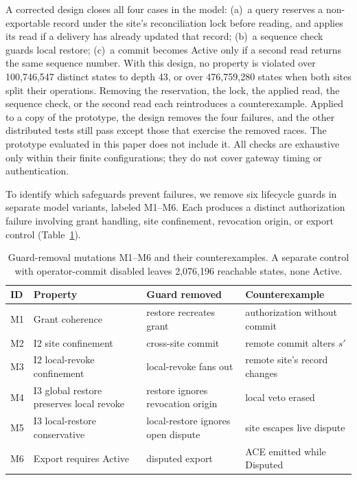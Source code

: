 \documentclass[journal]{IEEEtran}
\theoremstyle{definition}
\begin{document}
A corrected design closes all four cases in the model:
(a)~a query reserves a non-exportable record under the site's reconciliation lock before reading, and applies its read if a delivery has already updated that record;
(b)~a sequence check guards local restore;
(c)~a commit becomes Active only if a second read returns the same sequence number.
With this design, no property is violated over 100,746,547 distinct states to depth 43, or over 476,759,280 states when both sites split their operations. Removing the reservation, the lock, the applied read, the sequence check, or the second read each reintroduces a counterexample. Applied to a copy of the prototype, the design removes the four failures, and the other distributed tests still pass except those that exercise the removed races. The prototype evaluated in this paper does not include it. All checks are exhaustive only within their finite configurations; they do not cover gateway timing or authentication.

To identify which safeguards prevent failures, we remove six lifecycle guards in separate model variants, labeled M1--M6. Each produces a distinct authorization failure involving grant handling, site confinement, revocation origin, or export control (Table~\ref{tab:tla}).

\begin{table}[t]
\centering
\caption{Guard-removal mutations M1--M6 and their counterexamples. A separate control with operator-commit disabled leaves 2,076,196 reachable states, none Active.}
\label{tab:tla}
\scriptsize
\begin{tabular}{@{}p{0.35cm}p{2.05cm}p{1.85cm}p{1.95cm}@{}}
\toprule
ID & Property & Guard removed & Counterexample \\
\midrule
M1 & Grant coherence & restore recreates grant & authorization without commit \\
M2 & I2 site confinement & cross-site commit & remote commit alters $s'$ \\
M3 & I2 local-revoke confinement & local-revoke fans out & remote site's record changes \\
M4 & I3 global restore preserves local revoke & restore ignores revocation origin & local veto erased \\
M5 & I3 local-restore conservative & local-restore ignores open dispute & site escapes live dispute \\
M6 & Export requires Active & disputed export & ACE emitted while Disputed \\
\bottomrule
\end{tabular}
\end{table}
\end{document}
